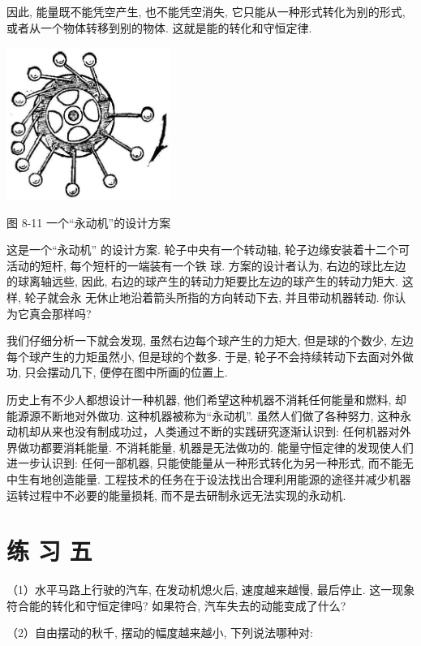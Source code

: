 \documentclass[10pt]{article}
\begin{document}
因此, 能量既不能凭空产生, 也不能凭空消失, 它只能从一种形式转化为别的形式, 或者从一个物体转移到别的物体. 这就是能的转化和守恒定律.

\begin{center}
\includegraphics[max width=0.4\textwidth]{images/01912d55-147c-70aa-b0e0-1782a122f948_251_354944.jpg}
\end{center}

图 8-11 一个“永动机”的设计方案

这是一个“永动机” 的设计方案. 轮子中央有一个转动轴, 轮子边缘安装着十二个可活动的短杆, 每个短杆的一端装有一个铁 球. 方案的设计者认为, 右边的球比左边的球离轴远些, 因此, 右边的球产生的转动力矩要比左边的球产生的转动力矩大. 这样, 轮子就会永 无休止地沿着箭头所指的方向转动下去, 并且带动机器转动. 你认为它真会那样吗?

我们仔细分析一下就会发现, 虽然右边每个球产生的力矩大, 但是球的个数少, 左边每个球产生的力矩虽然小, 但是球的个数多. 于是, 轮子不会持续转动下去面对外做功, 只会摆动几下, 便停在图中所画的位置上.

历史上有不少人都想设计一种机器, 他们希望这种机器不消耗任何能量和燃料, 却能源源不断地对外做功. 这种机器被称为“永动机”. 虽然人们做了各种努力, 这种永动机却从来也没有制成功过，人类通过不断的实践研究逐渐认识到: 任何机器对外界做功都要消耗能量. 不消耗能量, 机器是无法做功的. 能量守恒定律的发现使人们进一步认识到: 任何一部机器, 只能使能量从一种形式转化为另一种形式, 而不能无中生有地创造能量. 工程技术的任务在于设法找出合理利用能源的途径并减少机器运转过程中不必要的能量损耗, 而不是去研制永远无法实现的永动机.

\section*{练 习 五}

（1）水平马路上行驶的汽车, 在发动机熄火后, 速度越来越慢, 最后停止. 这一现象符合能的转化和守恒定律吗? 如果符合, 汽车失去的动能变成了什么?

（2）自由摆动的秋千, 摆动的幅度越来越小, 下列说法哪种对:
\end{document}
